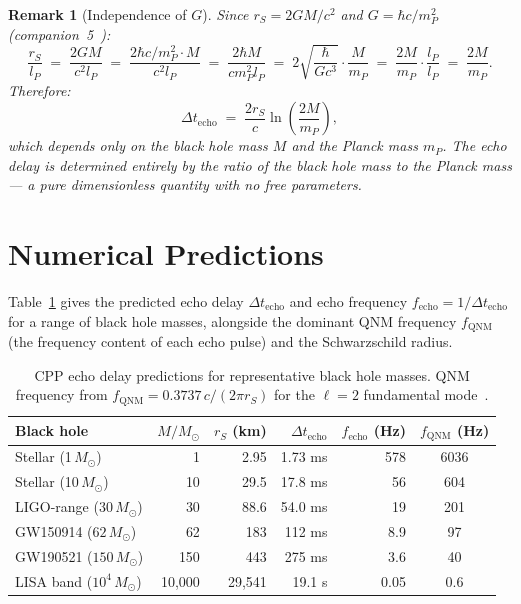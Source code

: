 \documentclass[12pt]{article}
\newtheorem{remark}[theorem]{Remark}
\newcommand{\lP}{l_P}
\newcommand{\mP}{m_P}
\newcommand{\rS}{r_S}
\newcommand{\Dt}{\Delta t_{\mathrm{echo}}}
\begin{document}
\begin{remark}[Independence of $G$]
Since $\rS = 2GM/c^2$ and $G = \hbar c/\mP^2$ (companion~5~\cite{c5}):
\begin{equation}
  \frac{\rS}{\lP} \;=\; \frac{2GM}{c^2\lP}
  \;=\; \frac{2\hbar c/\mP^2 \cdot M}{c^2\lP}
  \;=\; \frac{2\hbar M}{c\mP^2\lP}
  \;=\; 2\sqrt{\frac{\hbar}{Gc^3}}\cdot\frac{M}{\mP}
  \;=\; \frac{2M}{\mP}\cdot\frac{\lP}{\lP}
  \;=\; \frac{2M}{\mP}.
  \label{eq:rs_over_lp}
\end{equation}
Therefore:
\begin{equation}
  \Dt \;=\; \frac{2\rS}{c}\ln\!\left(\frac{2M}{\mP}\right),
  \label{eq:delay_planck}
\end{equation}
which depends only on the black hole mass $M$ and the Planck mass $\mP$.
The echo delay is determined entirely by the ratio of the black hole mass
to the Planck mass — a pure dimensionless quantity with no free parameters.
\end{remark}

\section{Numerical Predictions}
\label{sec:predictions}

Table~\ref{tab:echoes} gives the predicted echo delay $\Dt$ and echo
frequency $f_{\mathrm{echo}} = 1/\Dt$ for a range of black hole masses,
alongside the dominant QNM frequency $f_{\mathrm{QNM}}$ (the frequency
content of each echo pulse) and the Schwarzschild radius.

\begin{table}[h]
\centering
\caption{CPP echo delay predictions for representative black hole masses.
QNM frequency from $f_{\mathrm{QNM}} = 0.3737\,c/(2\pi\rS)$ for the
$\ell = 2$ fundamental mode~\cite{berti2009}.}
\label{tab:echoes}
\renewcommand{\arraystretch}{1.35}
\begin{tabular}{@{}lrrrrc@{}}
\toprule
Black hole & $M/M_\odot$ & $\rS$ (km) & $\Dt$ & $f_{\mathrm{echo}}$ (Hz)
  & $f_{\mathrm{QNM}}$ (Hz) \\
\midrule
Stellar (1\,$M_\odot$)       &      1 &     2.95 &   1.73 ms &    578 & 6036 \\
Stellar (10\,$M_\odot$)      &     10 &    29.5  &  17.8 ms  &     56 &  604 \\
LIGO-range (30\,$M_\odot$)   &     30 &    88.6  &  54.0 ms  &     19 &  201 \\
GW150914 ($62\,M_\odot$)     &     62 &   183    & 112 ms    &    8.9 &   97 \\
GW190521 ($150\,M_\odot$)    &    150 &   443    & 275 ms    &    3.6 &   40 \\
LISA band ($10^4\,M_\odot$)  & 10,000 & 29,541   & 19.1 s    &   0.05 &  0.6 \\
\bottomrule
\end{tabular}
\end{table}
\end{document}
